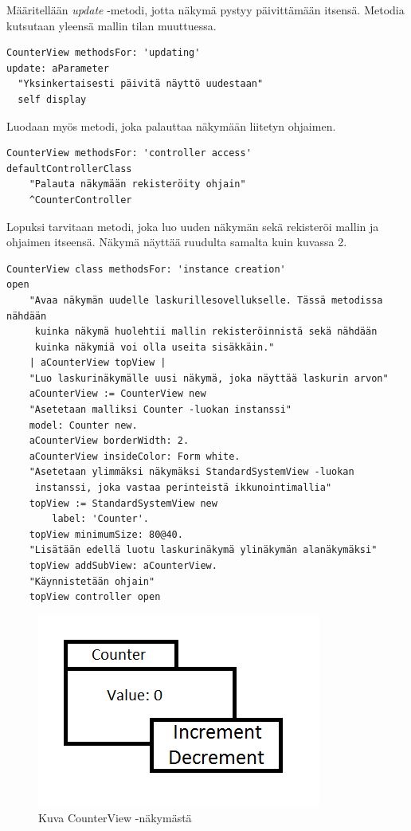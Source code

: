 \documentclass[finnish,utf8,nonumbib,palatino,kandi]{gradu2}
\begin{document}
Määritellään \emph{update} -metodi, jotta näkymä pystyy päivittämään itsensä. Metodia kutsutaan
yleensä mallin tilan muuttuessa.
\begin{lstlisting}[language=Smalltalk]
CounterView methodsFor: 'updating' 
update: aParameter
  "Yksinkertaisesti päivitä näyttö uudestaan" 
  self display
\end{lstlisting} 
Luodaan myös metodi, joka palauttaa näkymään liitetyn ohjaimen.
\begin{lstlisting}[language=Smalltalk]
CounterView methodsFor: 'controller access'
defaultControllerClass
	"Palauta näkymään rekisteröity ohjain"
	^CounterController
\end{lstlisting} 

Lopuksi tarvitaan metodi, joka luo uuden näkymän sekä rekisteröi mallin ja ohjaimen itseensä. Näkymä näyttää ruudulta 
samalta kuin kuvassa 2.
\begin{lstlisting}[language=Smalltalk]
CounterView class methodsFor: 'instance creation'
open
	"Avaa näkymän uudelle laskurillesovellukselle. Tässä metodissa nähdään
	 kuinka näkymä huolehtii mallin rekisteröinnistä sekä nähdään
	 kuinka näkymiä voi olla useita sisäkkäin."
	| aCounterView topView |
	"Luo laskurinäkymälle uusi näkymä, joka näyttää laskurin arvon"
	aCounterView := CounterView new 
	"Asetetaan malliksi Counter -luokan instanssi"
	model: Counter new.
	aCounterView borderWidth: 2.
	aCounterView insideColor: Form white.
	"Asetetaan ylimmäksi näkymäksi StandardSystemView -luokan
	 instanssi, joka vastaa perinteistä ikkunointimallia"
	topView := StandardSystemView new 
		label: 'Counter'. 
	topView minimumSize: 80@40. 
	"Lisätään edellä luotu laskurinäkymä ylinäkymän alanäkymäksi"
	topView addSubView: aCounterView.
	"Käynnistetään ohjain"
	topView controller open
\end{lstlisting} 

\begin{figure}[h]
\centering
\includegraphics[scale=0.85]{counter.png}
\caption{Kuva CounterView -näkymästä \cite{Krasner:desc}}
\end{figure}
\end{document}
